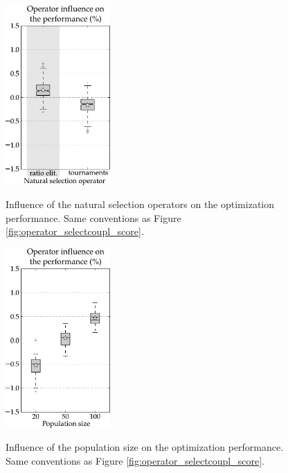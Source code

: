 \documentclass{ametsoc}
\begin{document}
\begin{figure}[t]
	\begin{center}
		\noindent\includegraphics[width=4cm,angle=0]{figures/operator_selectnat_score.pdf}\\
	\end{center}
	\caption{Influence of the natural selection operators on the optimization performance. Same conventions as Figure \ref{fig:operator_selectcoupl_score}.}
	\label{fig:operator_selectnat_score}
\end{figure}

\begin{figure}[t]
	\begin{center}
		\noindent\includegraphics[width=4cm,angle=0]{figures/option_taillepop_score.pdf}\\
	\end{center}
	\caption{Influence of the population size on the optimization performance. Same conventions as Figure \ref{fig:operator_selectcoupl_score}.}
	\label{fig:option_taillepop_score}
\end{figure}
\end{document}
